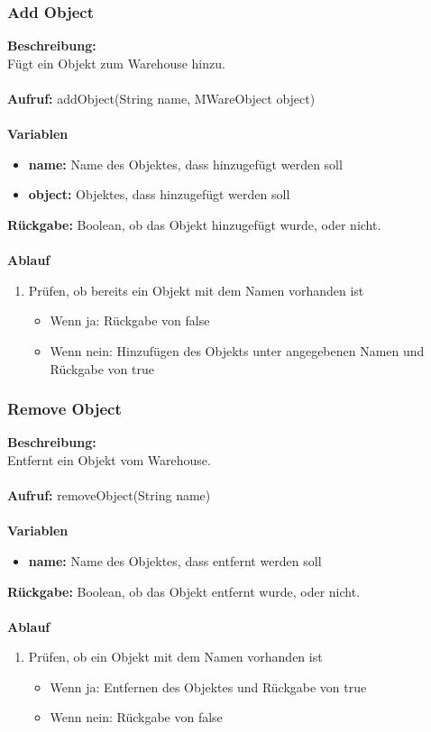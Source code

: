 \subsubsection{Add Object}
\textbf{Beschreibung:}\\
Fügt ein Objekt zum Warehouse hinzu. \\ \\
\textbf{Aufruf:} addObject(String name, MWareObject object)\\ \\
\textbf{Variablen}
\begin{itemize}
\item \textbf{name:} Name des Objektes, dass hinzugefügt werden soll
\item \textbf{object:} Objektes, dass hinzugefügt werden soll
\end{itemize}
\textbf{Rückgabe:} Boolean, ob das Objekt hinzugefügt wurde, oder nicht.\\ \\
\textbf{Ablauf}
\begin{enumerate}
\item Prüfen, ob bereits ein Objekt mit dem Namen vorhanden ist
\begin{itemize}
\item Wenn ja: Rückgabe von false
\item Wenn nein: Hinzufügen des Objekts unter angegebenen Namen und Rückgabe von true
\end{itemize}
\end{enumerate}

\subsubsection{Remove Object}
\textbf{Beschreibung:}\\
Entfernt ein Objekt vom Warehouse. \\ \\
\textbf{Aufruf:} removeObject(String name)\\ \\
\textbf{Variablen}
\begin{itemize}
\item \textbf{name:} Name des Objektes, dass entfernt werden soll
\end{itemize}
\textbf{Rückgabe:} Boolean, ob das Objekt entfernt wurde, oder nicht.\\ \\
\textbf{Ablauf}
\begin{enumerate}
\item Prüfen, ob ein Objekt mit dem Namen vorhanden ist
\begin{itemize}
\item Wenn ja: Entfernen des Objektes und Rückgabe von true
\item Wenn nein: Rückgabe von false
\end{itemize}
\end{enumerate}

